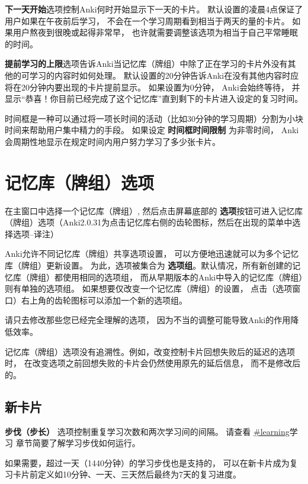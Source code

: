 \documentclass[a4paper]{book}
\begin{document}
\textbf{下一天开始}选项控制Anki何时开始显示下一天的卡片。 默认设置的凌晨4点保证了用户如果在午夜前后学习， 不会在一个学习周期看到相当于两天的量的卡片。 如果用户熬夜到很晚或起得非常早， 也许就需要调整该选项为相当于自己平常睡眠的时间。

\textbf{提前学习的上限}选项告诉Anki当记忆库（牌组）中除了正在学习的卡片外没有其他的可学习的内容时如何处理。 默认设置的20分钟告诉Anki在没有其他内容时应将在20分钟内要出现的卡片提前显示。 如果设置为0分钟， Anki会始终等待， 并显示“恭喜！你目前已经完成了这个记忆库”直到剩下的卡片进入设定的复习时间。

时间框是一种可以通过将一项长时间的活动（比如30分钟的学习周期）分割为小块时间来帮助用户集中精力的手段。 如果设定
\textbf{时间框时间限制} 为非零时间， Anki会周期性地显示在规定时间内用户努力学习了多少张卡片。

\chapter{记忆库（牌组）选项}\label{}

在主窗口中选择一个记忆库（牌组）, 然后点击屏幕底部的
\textbf{选项}按钮可进入记忆库（牌组）选项（Anki2.0.31为点击记忆库右侧的齿轮图标，然后在出现的菜单中选择选项--译注）

Anki允许不同记忆库（牌组）共享选项设置， 可以方便地迅速就可以为多个记忆库（牌组）更新设置。 为此，选项被集合为
\textbf{选项组}。默认情况，所有新创建的记忆库（牌组）都使用相同的选项组， 而从早期版本的Anki中导入的记忆库（牌组）则有单独的选项组。 如果想要仅改变一个记忆库（牌组）的设置， 点击（选项窗口）右上角的齿轮图标可以添加一个新的选项组。

请只去修改那些您已经完全理解的选项， 因为不当的调整可能导致Anki的作用降低效率。

\begin{shaded}
	记忆库（牌组）选项没有追溯性。例如，改变控制卡片回想失败后的延迟的选项时， 在改变选项之前回想失败的卡片会仍然使用原先的延后信息， 而不是修改后的。
\end{shaded}

\section{新卡片}
\textbf{步伐（步长）} 选项控制重复学习次数和两次学习间的间隔。 请查看 \url{#learning}学习 章节简要了解学习步伐如何运行。

如果需要，超过一天（1440分钟）的学习步伐也是支持的， 可以在新卡片成为复习卡片前定义如10分钟、一天、三天然后最终为7天的复习进度。
\end{document}
